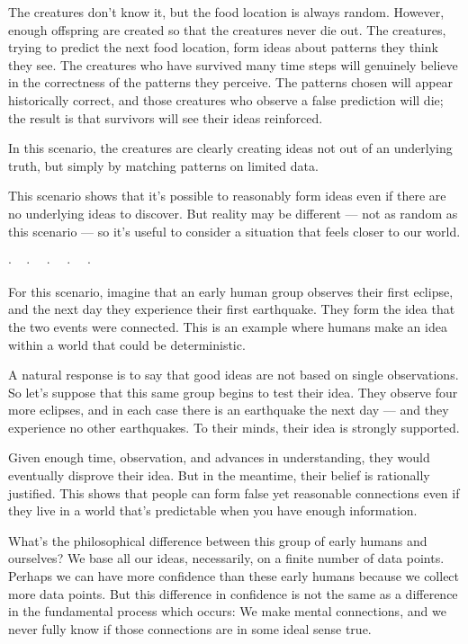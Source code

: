 \documentclass[9pt, twoside]{book}
\theoremstyle{argtstyle}
\newcommand{\dotq}{\cdot\quad}
\newcommand{\scenebreak}{
    \medskip\centerline{$\dotq\dotq\dotq\dotq\cdot$}\medskip
}
\begin{document}
        The creatures don't know it, but the food location is always random.
        However, enough offspring are created so that the creatures never
        die out. The creatures, trying to predict the next food location,
        form ideas about patterns they think they see.
        The creatures who have survived
        many time steps will genuinely
        believe in the correctness of the patterns they perceive.
        The patterns chosen will appear historically correct, and those
        creatures who observe a false prediction will die; the result is that
        survivors will see their ideas reinforced.

        In this scenario, the creatures are clearly creating ideas not out of an
        underlying truth, but simply by matching patterns on limited data.

        This scenario shows that it's possible to reasonably form ideas even if
        there are no underlying ideas to discover.
        But reality may be different --- not as random as this scenario ---
        so it's useful to consider a situation that feels closer to our world.

\scenebreak

\noindent [{\bf Scenario B.}]\quad
        For this scenario,
        imagine that an early human group observes their first
        eclipse, and the next day they experience their first
        earthquake. They form the idea that the two
        events were connected. This is an example where humans make an idea
        within a world that could be deterministic.

        A natural response is to say that good ideas are not based on single
        observations.
        So let's suppose
        that this same group begins to test their idea. They
        observe four more eclipses, and in each case there is an earthquake the
        next day --- and they experience no other earthquakes. To their minds,
        their idea is strongly supported.

        Given enough time, observation, and advances in understanding, they
        would eventually disprove their idea. But in the meantime, their
        belief is rationally justified.
        This shows that people can form false yet reasonable connections
        even if they live in a world that's predictable when you have
        enough information.

        What's the philosophical difference between this group of
        early humans and ourselves? We base all our ideas, necessarily, on a
        finite number of data points. Perhaps we can have more confidence than
        these early humans because we collect more data points. But this
        difference in confidence
        is not the same as a difference in the fundamental process which occurs:
        We make mental connections, and we never fully know if those connections
        are in some ideal sense true.
\end{document}
